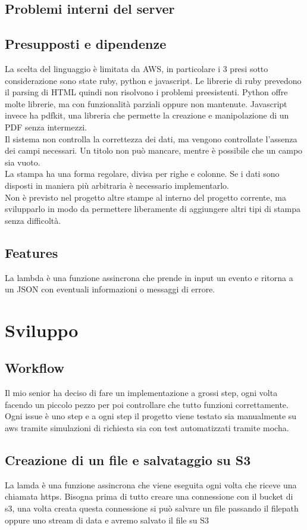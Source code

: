 \documentclass[12pt]{article}
\begin{document}
\subsection{Problemi interni del server}
\subsection{Presupposti e dipendenze}
La scelta del linguaggio è limitata da AWS, in particolare i 3 presi sotto considerazione 
sono state ruby, python e javascript. 
Le librerie di ruby prevedono il parsing di HTML quindi non risolvono i problemi 
preesistenti. 
Python offre molte librerie, ma con funzionalità parziali oppure non mantenute. 
Javascript invece ha pdfkit, una libreria che permette la creazione e manipolazione 
di un PDF senza intermezzi. 
\\ Il sistema non controlla la correttezza dei dati, ma vengono controllate l'assenza 
dei campi necessari. Un titolo non può mancare, mentre è possibile che un campo 
sia vuoto. 
\\ La stampa ha una forma regolare, divisa per righe e colonne. Se i dati sono 
disposti in maniera più arbitraria è necessario implementarlo. 
\\ Non è previsto nel progetto altre stampe al interno del progetto corrente, ma 
svilupparlo in modo da permettere liberamente di aggiungere altri tipi di stampa 
senza difficoltà. 

\subsection{Features}
La lambda è una funzione assincrona che prende in input un evento e ritorna a 
un JSON con eventuali informazioni o messaggi di errore. 

\section{Sviluppo}
\subsection{Workflow}
Il mio senior ha deciso di fare un implementazione a grossi step, ogni volta
facendo un piccolo pezzo per poi controllare che tutto funzioni correttamente.
Ogni issue è uno step e a ogni step il progetto viene testato sia manualmente su
aws tramite simulazioni di richiesta sia con test automatizzati tramite mocha.

\subsection{Creazione di un file e salvataggio su S3}
La lamda è una funzione assincrona che viene eseguita ogni volta che riceve una
chiamata https. Bisogna prima di tutto creare una connessione con il bucket di s3,
una volta creata questa connessione si può salvare un file passando il filepath
oppure uno stream di data e avremo salvato il file su S3
\end{document}
